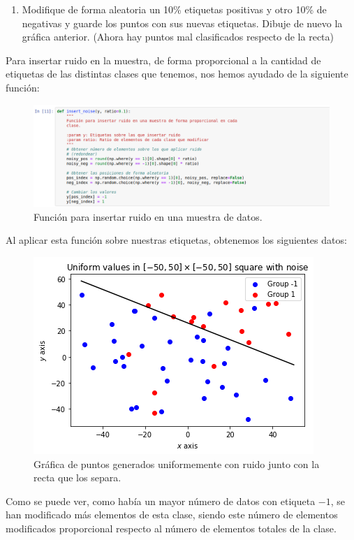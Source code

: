 \documentclass[11pt,a4paper]{article}
\begin{document}
\begin{enumerate}[resume,label=\textit{\alph*})]
	\item Modifique de forma aleatoria un 10\% etiquetas positivas y otro 10\% de negativas
	y guarde los puntos con sus nuevas etiquetas. Dibuje de nuevo la gráfica anterior.
	(Ahora hay puntos mal clasificados respecto de la recta)
\end{enumerate}

Para insertar ruido en la muestra, de forma proporcional a la cantidad de etiquetas de las distintas
clases que tenemos, nos hemos ayudado de la siguiente función:

\begin{figure}[H]
\centering
\includegraphics[scale=0.4]{img/insert_noise.png}
\caption{Función para insertar ruido en una muestra de datos.}
\end{figure}

Al aplicar esta función sobre nuestras etiquetas, obtenemos los siguientes datos:

\begin{figure}[H]
\centering
\includegraphics[scale=0.6]{img/data_line_noise.png}
\caption{Gráfica de puntos generados uniformemente con ruido junto con la recta que los separa.}
\end{figure}

Como se puede ver, como había un mayor número de datos con etiqueta $-1$, se han modificado más
elementos de esta clase, siendo este número de elementos modificados proporcional respecto al número
de elementos totales de la clase.
\end{document}
